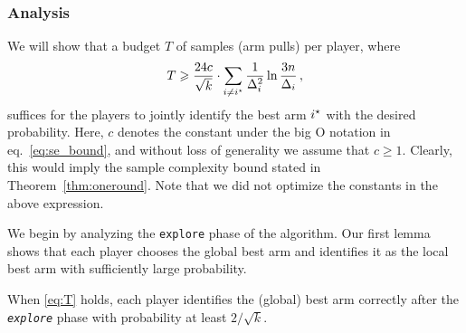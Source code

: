 



\subsubsection{Analysis}


We will show that a budget $T$ of samples (arm pulls) per player, where%
\begin{align} \label{eq:T}
	T 
	\geqslant \frac{24 c}{\sqrt{k}} \cdot
			\sum_{i \ne i^\star} \frac{1}{\Delta_i^2} \ln \frac{3n}{\Delta_i} \,,
\end{align}
suffices for the players to jointly identify the best arm
$i^\star$ with the desired probability.
Here, $c$ denotes the constant under the big O notation in eq.~\eqref{eq:se_bound}, and without loss of generality we assume that $c \ge 1$.
Clearly, this would imply the sample complexity bound stated in Theorem~\ref{thm:oneround}. Note that we did not optimize the constants in the above expression.


We begin by analyzing the \texttt{explore} phase of the algorithm. Our first lemma shows that each player chooses the global best arm and identifies it as the local best arm with sufficiently large probability.


\begin{lemma} \label{lem:kexplore}
When \eqref{eq:T} holds, each player identifies the (global) best arm correctly after the \emph{\texttt{explore}} phase with probability at least $2/\sqrt{k}$.
\end{lemma}


